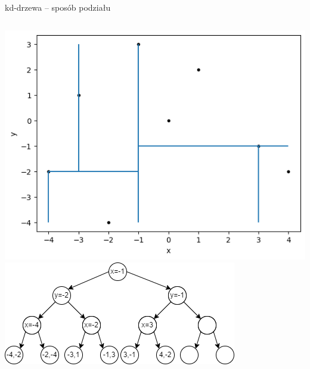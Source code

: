 \documentclass[aspectratio=169,dvipsnames]{beamer}
\begin{document}
\begin{frame}{kd-drzewa -- sposób podziału}
    \begin{columns}
        \includegraphics[width=\textwidth]{images/plots/7}
        \includegraphics[width=\textwidth]{images/trees/10.drawio}
    \end{columns}
\end{frame}
\end{document}
